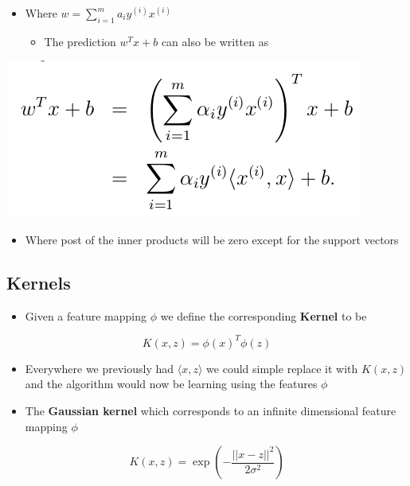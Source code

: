 \documentclass[11pt]{article}
\begin{document}
\begin{itemize}
\item Where \(w= \sum_{i=1}^m a_iy^{(i)}x^{(i)}\) 
\begin{itemize}
\item The prediction \(w^Tx+b\) can also be written as
\end{itemize}
\end{itemize}
\begin{center}
\includegraphics[width=.9\linewidth]{Support Vector Machines/screenshot_2018-09-25_07-50-38.png}
\end{center}
\begin{itemize}
\item Where post of the inner products will be zero except for the support vectors
\end{itemize}

\subsection{Kernels}
\label{sec:org44d901c}
\begin{itemize}
\item Given a feature mapping \(\phi\) we define the corresponding \textbf{Kernel} to be
\end{itemize}
\begin{equation}
  K(x,z) = \phi(x)^T\phi(z)
\end{equation}
\begin{itemize}
\item Everywhere we previously had \(\langle x, z \rangle\) we could simple replace it with \(K(x,z)\) and the algorithm would now be learning using the features \(\phi\)

\item The \textbf{Gaussian kernel} which corresponds to an infinite dimensional feature mapping \(\phi\)
\end{itemize}
\begin{equation}
  K(x,z) = \exp(-\frac{||x-z||^2}{2\sigma^2})
\end{equation} 
\end{document}
